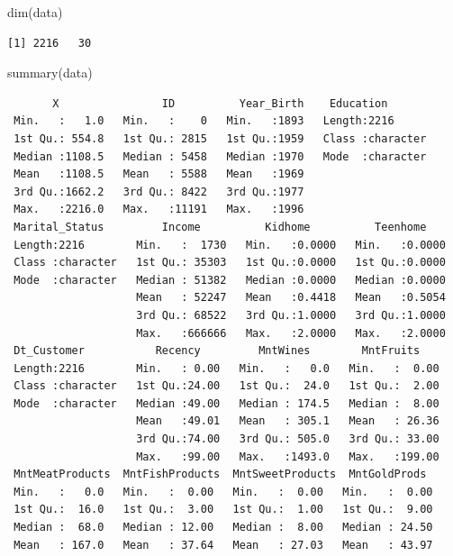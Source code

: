 \documentclass[
  a4paperpaper,
  DIV=11,
  numbers=noendperiod]{scrartcl}
\newenvironment{Shaded}{}{}
\newcommand{\FunctionTok}[1]{\textcolor[rgb]{0.39,0.29,0.61}{#1}}
\newcommand{\NormalTok}[1]{\textcolor[rgb]{0.12,0.11,0.11}{#1}}
\begin{document}
\begin{Shaded}
\begin{Highlighting}[]
\FunctionTok{dim}\NormalTok{(data)}
\end{Highlighting}
\end{Shaded}

\begin{verbatim}
[1] 2216   30
\end{verbatim}

\begin{Shaded}
\begin{Highlighting}[]
\FunctionTok{summary}\NormalTok{(data)}
\end{Highlighting}
\end{Shaded}

\begin{verbatim}
       X                ID          Year_Birth    Education        
 Min.   :   1.0   Min.   :    0   Min.   :1893   Length:2216       
 1st Qu.: 554.8   1st Qu.: 2815   1st Qu.:1959   Class :character  
 Median :1108.5   Median : 5458   Median :1970   Mode  :character  
 Mean   :1108.5   Mean   : 5588   Mean   :1969                     
 3rd Qu.:1662.2   3rd Qu.: 8422   3rd Qu.:1977                     
 Max.   :2216.0   Max.   :11191   Max.   :1996                     
 Marital_Status         Income          Kidhome          Teenhome     
 Length:2216        Min.   :  1730   Min.   :0.0000   Min.   :0.0000  
 Class :character   1st Qu.: 35303   1st Qu.:0.0000   1st Qu.:0.0000  
 Mode  :character   Median : 51382   Median :0.0000   Median :0.0000  
                    Mean   : 52247   Mean   :0.4418   Mean   :0.5054  
                    3rd Qu.: 68522   3rd Qu.:1.0000   3rd Qu.:1.0000  
                    Max.   :666666   Max.   :2.0000   Max.   :2.0000  
 Dt_Customer           Recency         MntWines        MntFruits     
 Length:2216        Min.   : 0.00   Min.   :   0.0   Min.   :  0.00  
 Class :character   1st Qu.:24.00   1st Qu.:  24.0   1st Qu.:  2.00  
 Mode  :character   Median :49.00   Median : 174.5   Median :  8.00  
                    Mean   :49.01   Mean   : 305.1   Mean   : 26.36  
                    3rd Qu.:74.00   3rd Qu.: 505.0   3rd Qu.: 33.00  
                    Max.   :99.00   Max.   :1493.0   Max.   :199.00  
 MntMeatProducts  MntFishProducts  MntSweetProducts  MntGoldProds   
 Min.   :   0.0   Min.   :  0.00   Min.   :  0.00   Min.   :  0.00  
 1st Qu.:  16.0   1st Qu.:  3.00   1st Qu.:  1.00   1st Qu.:  9.00  
 Median :  68.0   Median : 12.00   Median :  8.00   Median : 24.50  
 Mean   : 167.0   Mean   : 37.64   Mean   : 27.03   Mean   : 43.97  

\end{verbatim}
\end{document}

